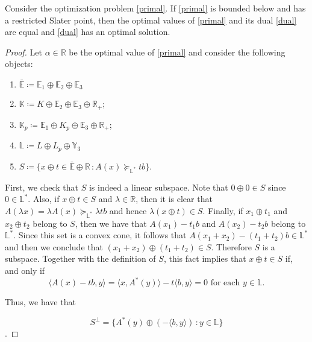 \documentclass[a4paper]{article}
\begin{document}
\begin{theorem}\label{strongduality}
  Consider the optimization problem \eqref{primal}. If \eqref{primal} is bounded
  below and has a restricted Slater point, then the optimal values of
  \eqref{primal} and its dual \eqref{dual} are equal and \eqref{dual} has an
  optimal solution.
\end{theorem}

\begin{proof}
Let $\alpha\in\mathbb{R}$ be the optimal value of \eqref{primal} and consider
the following objects:
\begin{enumerate}[label=(\roman*)]
\item $\bar{\mathbb{E}}\coloneqq \mathbb{E}_1\oplus\mathbb{E}_2\oplus\mathbb{E}_3$
\item $\mathbb{K}\coloneqq K\oplus\mathbb{E}_2 \oplus\mathbb{E}_3\oplus\mathbb{R}_+$;
\item \(\mathbb{K}_p\coloneqq \mathbb{E}_1\oplus K_p\oplus\mathbb{E}_3\oplus\mathbb{R}_+\);
\item \(\mathbb{L}\coloneqq L \oplus L_p\oplus\mathbb{Y}_3\)
\item $S\coloneqq\{x\oplus
t\in\bar{\mathbb{E}}\oplus\mathbb{R}\,\colon A(x)\succeq_{\mathbb{L}^\ast} tb\}$.
\end{enumerate}
First, we check that \(S\) is indeed a linear subspace. Note that \(0\oplus 0\in
S\) since \(0\in \mathbb{L}^\ast\). Also, if \(x\oplus t\in S\)
and \(\lambda\in\mathbb{R}\), then it is clear that \(A(\lambda x)=\lambda
A(x)\succeq_{\mathbb{L}^\ast} \lambda tb\) and hence
\(\lambda(x\oplus t)\in S\). Finally, if \(x_1\oplus t_1\) and \(x_2\oplus t_2\)
belong to \(S\), then we have that  \(A(x_1)-t_1b\) and \(A(x_2)-t_2b\) belong
to \(\mathbb{L}^\ast\). Since this set is a convex cone, it
follows  that \(A(x_1+x_2)-(t_1+t_2)b \in
  \mathbb{L}^\ast\)
and then we conclude that \((x_1+x_2)\oplus(t_1+t_2)\in S\). Therefore \(S\) is
a subspace. Together with the definition of \(S\), this fact implies that
\(x\oplus t\in S\) if, and only if
\[\langle A(x)-tb, y\rangle =\langle x,A^\ast(y)\rangle-t\langle b,y\rangle=0
  \text{ for each } y \in \mathbb{L}.\]

Thus, we have that 

\[S^\bot=\{A^\ast(y)\oplus(-\langle b,y\rangle)\,\colon y\in\mathbb{L}\}\].


\end{proof}
\end{document}
